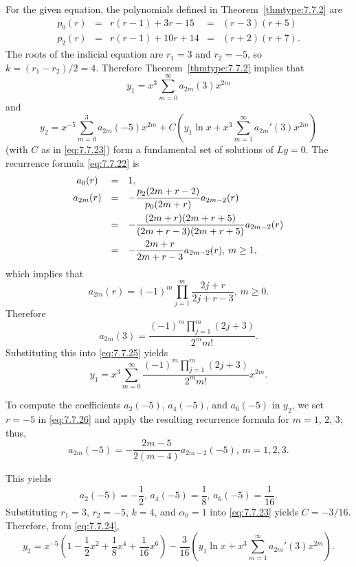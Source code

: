 \begin{examplesolution}
\solution For the given equation, the polynomials defined in Theorem~\ref{thmtype:7.7.2} are
\[
  \begin{array}{ccccc}
    p_{0}(r) & = & r(r-1)+3r-15  & = & (r-3)(r+5)  \\[5pt]
    p_{2}(r) & = & r(r-1)+10r+14 & = & (r+2)(r+7).
  \end{array}
\]
The roots of the indicial equation are $r_{1}=3$ and $r_{2}=-5$, so $k=(r_{1}-r_{2})/2=4$. Therefore
Theorem~\ref{thmtype:7.7.2} implies that
\begin{equation}
  \label{eq:7.7.25}y_{1}=x^{3}\sum_{m=0}^{\infty}a_{2m}(3)x^{2m}
\end{equation}
and
\[
  y_{2}=x^{-5}\sum_{m=0}^{3}a_{2m}(-5)x^{2m}+C \left(y_{1}\ln x+x^{3}\sum_{m=1}^{\infty}a_{2m}'(3)x^{2m}\right)
\]
(with $C$ as in \eqref{eq:7.7.23}) form a fundamental set of solutions of $Ly=0$. The recurrence
formula \eqref{eq:7.7.22} is
\begin{equation}
  \label{eq:7.7.26}
  \begin{array}{ccl}
    a_{0}(r)  & = & 1,                                                      \\
    a_{2m}(r) & = & -\displaystyle\frac{p_{2}(2m+r-2)}{p_{0}(2m+r)}a_{2m-2}(r)       \\[10pt]
              & = & -\displaystyle\frac{(2m+r)(2m+r+5)}{(2m+r-3)(2m+r+5)}a_{2m-2}(r) \\[10pt]
              & = & -\displaystyle\frac{2m+r}{2m+r-3}a_{2m-2}(r),\,m\ge1,
  \end{array}
\end{equation}
which implies that
\begin{equation}
  \label{eq:7.7.27}a_{2m}(r)=(-1)^{m}\prod_{j=1}^{m}\frac{2j+r}{2j+r-3},\,m\ge0.
\end{equation}
Therefore
\begin{equation}
  \label{eq:7.7.28}a_{2m}(3)=\frac{(-1)^{m}\prod_{j=1}^{m}(2j+3)}{2^{m}m!}.
\end{equation}
Substituting this into \eqref{eq:7.7.25} yields
\[
  y_{1}=x^{3}\sum_{m=0}^{\infty}\frac{(-1)^{m}\prod_{j=1}^{m}(2j+3)}{2^{m}m!}x^{2m}.
\]

To compute the coefficients $a_{2}(-5)$, $a_{4}(-5)$, and $a_{6}(-5)$ in $y_{2}$, we set $r=-5$ in
\eqref{eq:7.7.26} and apply the resulting recurrence formula for $m=1$, $2$, $3$; thus,
\[
  a_{2m}(-5)=-\frac{2m-5}{2(m-4)}a_{2m-2}(-5),\,m=1,2,3.
\]

This yields
\[
  a_{2}(-5)=-\frac{1}{2},\,a_{4}(-5)=\frac{1}{8},\,a_{6}(-5)=\frac{1}{16}.
\]
Substituting $r_{1}=3$, $r_{2}=-5$, $k=4$, and $\alpha_{0}=1$ into \eqref{eq:7.7.23} yields
$C=-3/16$. Therefore, from \eqref{eq:7.7.24},
\begin{equation}
  \label{eq:7.7.29}y_{2}=x^{-5}\left(1-\frac{1}{2}x^{2}+\frac{1}{8}x^{4}+\frac{1}{16}x^{6}\right) -\frac{3}{16}\left(y_{1}\ln x+x^{3}\sum_{m=1}^{\infty}a_{2m}'(3)x^{2m}\right).
\end{equation}


\end{examplesolution}
